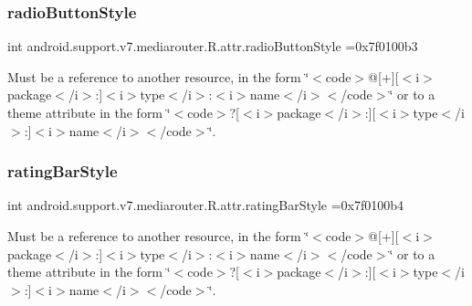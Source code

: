 \subsubsection{\texorpdfstring{radio\+Button\+Style}{radioButtonStyle}}
{\footnotesize\ttfamily int android.\+support.\+v7.\+mediarouter.\+R.\+attr.\+radio\+Button\+Style =0x7f0100b3\hspace{0.3cm}{\ttfamily [static]}}

Must be a reference to another resource, in the form \char`\"{}$<$code$>$@\mbox{[}+\mbox{]}\mbox{[}$<$i$>$package$<$/i$>$\+:\mbox{]}$<$i$>$type$<$/i$>$\+:$<$i$>$name$<$/i$>$$<$/code$>$\char`\"{} or to a theme attribute in the form \char`\"{}$<$code$>$?\mbox{[}$<$i$>$package$<$/i$>$\+:\mbox{]}\mbox{[}$<$i$>$type$<$/i$>$\+:\mbox{]}$<$i$>$name$<$/i$>$$<$/code$>$\char`\"{}. \mbox{\label{classandroid_1_1support_1_1v7_1_1mediarouter_1_1R_1_1attr_a19ff1f11c2808ded29e99126ee9999ac}} 
\subsubsection{\texorpdfstring{rating\+Bar\+Style}{ratingBarStyle}}
{\footnotesize\ttfamily int android.\+support.\+v7.\+mediarouter.\+R.\+attr.\+rating\+Bar\+Style =0x7f0100b4\hspace{0.3cm}{\ttfamily [static]}}

Must be a reference to another resource, in the form \char`\"{}$<$code$>$@\mbox{[}+\mbox{]}\mbox{[}$<$i$>$package$<$/i$>$\+:\mbox{]}$<$i$>$type$<$/i$>$\+:$<$i$>$name$<$/i$>$$<$/code$>$\char`\"{} or to a theme attribute in the form \char`\"{}$<$code$>$?\mbox{[}$<$i$>$package$<$/i$>$\+:\mbox{]}\mbox{[}$<$i$>$type$<$/i$>$\+:\mbox{]}$<$i$>$name$<$/i$>$$<$/code$>$\char`\"{}. \mbox{\label{classandroid_1_1support_1_1v7_1_1mediarouter_1_1R_1_1attr_a6da633064108a481fdd0b21392b9ef0e}} 
